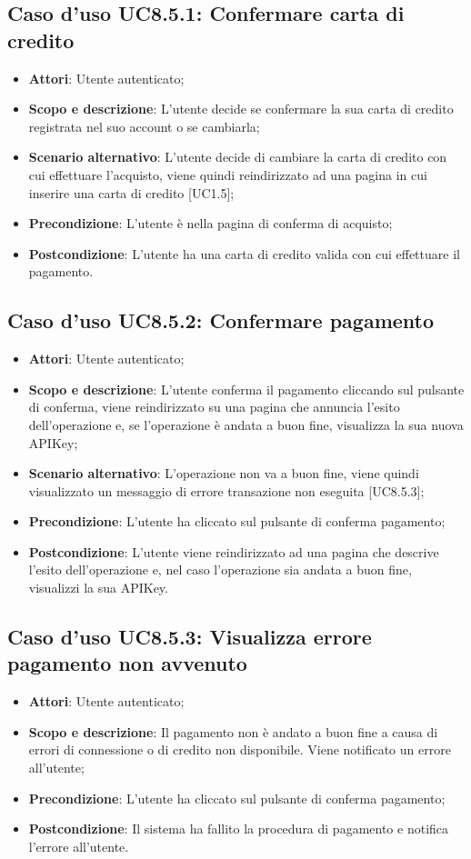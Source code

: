 \documentclass[12pt,a4paper,titlepage]{article}
\begin{document}
	\subsection{Caso d'uso UC8.5.1: Confermare carta di credito}
	\label{UC8.5.1}
	\begin{itemize}
		\item \textbf{Attori}: Utente autenticato;
		\item \textbf{Scopo e descrizione}: L'utente decide se confermare la sua carta di credito registrata nel suo account o se cambiarla;
		\item \textbf{Scenario alternativo}: L'utente decide di cambiare la carta di credito con cui effettuare l'acquisto, viene quindi reindirizzato ad una pagina in cui inserire una carta di credito [UC1.5];
		\item \textbf{Precondizione}: L'utente è nella pagina di conferma di acquisto;
		\item \textbf{Postcondizione}: L'utente ha una carta di credito valida con cui effettuare il pagamento.
	\end{itemize}
	\subsection{Caso d'uso UC8.5.2: Confermare pagamento}
	\label{UC8.5.2}
	\begin{itemize}
		\item \textbf{Attori}: Utente autenticato;
		\item \textbf{Scopo e descrizione}: L'utente conferma il pagamento cliccando sul pulsante di conferma, viene reindirizzato su una pagina che annuncia l'esito dell'operazione e, se l'operazione è andata a buon fine, visualizza la sua nuova APIKey;
		\item \textbf{Scenario alternativo}: L'operazione non va a buon fine, viene quindi visualizzato un messaggio di errore transazione non eseguita [UC8.5.3];
		\item \textbf{Precondizione}: L'utente ha cliccato sul pulsante di conferma pagamento;
		\item \textbf{Postcondizione}: L'utente viene reindirizzato ad una pagina che descrive l'esito dell'operazione e, nel caso l'operazione sia andata a buon fine, visualizzi la sua APIKey.
	\end{itemize}
	\subsection{Caso d'uso UC8.5.3: Visualizza errore pagamento non avvenuto}
	\label{UC8.5.3}
	\begin{itemize}
		\item \textbf{Attori}: Utente autenticato;
		\item \textbf{Scopo e descrizione}: Il pagamento non è andato a buon fine a causa di errori di connessione o di credito non disponibile. Viene notificato un errore all'utente;
		\item \textbf{Precondizione}: L'utente ha cliccato sul pulsante di conferma pagamento;
		\item \textbf{Postcondizione}: Il sistema ha fallito la procedura di pagamento e notifica l'errore all'utente.
	\end{itemize}
\end{document}
